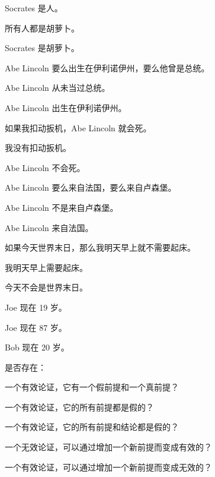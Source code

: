 \begin{compactlist}
\item
\begin{earg}
\item Socrates 是人。
\item 所有人都是胡萝卜。
\item[\texttherefore] Socrates 是胡萝卜。
\end{earg}
\item
\begin{earg}
\item Abe Lincoln 要么出生在伊利诺伊州，要么他曾是总统。
\item Abe Lincoln 从未当过总统。
\item[\texttherefore] Abe Lincoln 出生在伊利诺伊州。
\end{earg}
\item
\begin{earg}
\item 如果我扣动扳机，Abe Lincoln 就会死。
\item 我没有扣动扳机。
\item[\texttherefore] Abe Lincoln 不会死。
\end{earg}
\item
\begin{earg}
\item Abe Lincoln 要么来自法国，要么来自卢森堡。
\item Abe Lincoln 不是来自卢森堡。
\item[\texttherefore] Abe Lincoln 来自法国。
\end{earg}
\item
\begin{earg}
\item 如果今天世界末日，那么我明天早上就不需要起床。
\item 我明天早上需要起床。
\item[\texttherefore] 今天不会是世界末日。
\end{earg}
\item
\begin{earg}
\item Joe 现在 19 岁。
\item Joe 现在 87 岁。
\item[\texttherefore] Bob 现在 20 岁。
\end{earg}
\end{compactlist}

\problempart
\label{pr.EnglishCombinations}
是否存在：


\begin{compactlist}
		\item 一个有效论证，它有一个假前提和一个真前提？
		\item 一个有效论证，它的所有前提都是假的？
		\item 一个有效论证，它的所有前提和结论都是假的？
		\item 一个无效论证，可以通过增加一个新前提而变成有效的？
		\item 一个有效论证，可以通过增加一个新前提而变成无效的？
	\end{compactlist}



